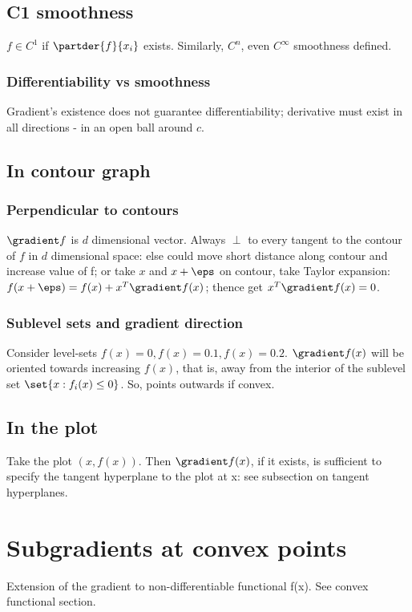 \documentclass[oneside, article]{memoir}
\begin{document}
\subsection{C1 smoothness}
$f \in C^{1}$ if $\partder{f}{x_i}$ exists. Similarly, $C^{n}$, even $C^{\infty}$ smoothness defined.

\subsubsection{Differentiability vs smoothness}
Gradient's existence does not guarantee differentiability; derivative must exist in all directions - in an open ball around $c$.

\subsection{In contour graph}
\subsubsection*{Perpendicular to contours}
$\gradient f$ is $d$ dimensional vector. Always $\perp$ to every tangent to the contour of $f$ in $d$ dimensional space: else could move short distance along contour and increase value of f; or take $x$ and $x + \eps$ on contour, take Taylor expansion: $f(x + \eps) = f(x) + x^{T}\gradient f(x)$; thence get $x^{T}\gradient f(x) = 0$.

\subsubsection*{Sublevel sets and gradient direction}
Consider level-sets $f(x) = 0, f(x) = 0.1, f(x) = 0.2$. $\gradient f(x)$ will be oriented towards increasing $f(x)$, that is, away from the interior of the sublevel set $\set{x: f_i(x) \leq 0}$. So, points outwards if convex.

\subsection{In the plot}
Take the plot $(x, f(x))$. Then $\gradient f(x)$, if it exists, is sufficient to specify the tangent hyperplane to the plot at x: see subsection on tangent hyperplanes.

\section{Subgradients at convex points}
Extension of the gradient to non-differentiable functional f(x). See convex functional section.
\end{document}

